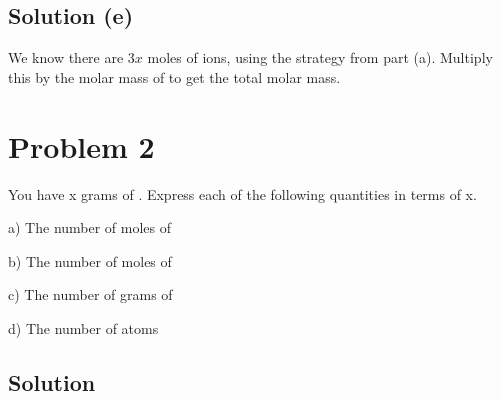 \documentclass{article}
\begin{document}
        \subsection{Solution (e)}
            We know there are $3x$ moles of  ions, using the strategy from part (a).
            Multiply this by the molar mass of  to get the total molar mass. 



    \pagebreak
    \section{Problem 2}
        You have x grams of . 
        Express each of the following quantities in terms of x.

        a) The number of moles of 

        b) The number of moles of 

        c) The number of grams of 

        d) The number of  atoms

        \subsection{Solution}
\end{document}

